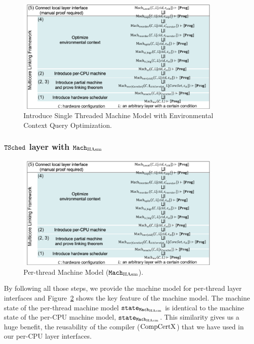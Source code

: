 \begin{figure}
\begin{center}
\includegraphics[width=0.9\textwidth, page=8]{figs/conlink/concurrent_linking}
\end{center}
\caption{Introduce Single Threaded Machine Model with Environmental Context Query Optimization.}
\label{fig:chapter:conlink:introduce-single-threaded-machine-model-with-tasm}
\end{figure}



\subsubsection{${{\mathrm{\texttt{TSched}}}}$ layer with ${\mathrm{\texttt{Mach}}}_{\mathrm{HAsm}}$} 



\begin{figure}
\begin{center}
\includegraphics[width=0.9\textwidth, page=9]{figs/conlink/concurrent_linking}
\end{center}
\caption{Per-thread Machine Model (${\mathrm{\texttt{Mach}}}_{\mathrm{HAsm}}$).}
\label{fig:chapter:conlink:per-thread-machine-model}
\end{figure}

By following all those steps, 
we provide the machine model for per-thread layer interfaces
and  Figure~\ref{fig:chapter:conlink:per-thread-machine-model} shows 
the key feature of the machine model.
The machine state of the per-thread machine model ${\mathrm{\texttt{state}}}_{{\mathrm{\texttt{Mach}}}_{\mathrm{HAsm}}}$ is identical
 to the machine state of the per-CPU machine model, ${\mathrm{\texttt{state}}}_{{\mathrm{\texttt{Mach}}}_{\mathrm{HAsm}}}$.
This similarity gives us a huge benefit, the reusability of the compiler ($\mathrm{CompCertX}$) 
that we have used in our per-CPU layer interfaces. 

